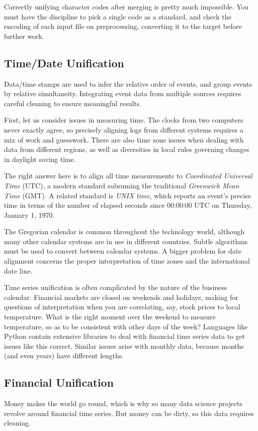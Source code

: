 \documentclass[10pt]{article}
\begin{document}
Correctly unifying character codes after merging is pretty much impossible. You must have the discipline to pick a single code as a standard, and check the encoding of each input file on preprocessing, converting it to the target before further work.

\subsection{Time/Date Unification}
Data/time stamps are used to infer the relative order of events, and group events by relative simultaneity. Integrating event data from multiple sources requires careful cleaning to ensure meaningful results.

First, let us consider issues in measuring time. The clocks from two computers never exactly agree, so precisely aligning logs from different systems requires a mix of work and guesswork. There are also time zone issues when dealing with data from different regions, as well as diversities in local rules governing changes in daylight saving time.

The right answer here is to align all time measurements to \emph{Coordinated Universal Time} (UTC), a modern standard subsuming the traditional \emph{Greenwich Mean Time} (GMT). A related standard is \emph{UNIX time}, which reports an event's precise time in terms of the number of elapsed seconds since 00:00:00 UTC on Thursday, January 1, 1970.

The Gregorian calendar is common throughout the technology world, although many other calendar systems are in use in different countries. Subtle algorithms must be used to convert between calendar systems. A bigger problem for date alignment concerns the proper interpretation of time zones and the international date line.

Time series unification is often complicated by the nature of the business calendar. Financial markets are closed on weekends and holidays, making for questions of interpretation when you are correlating, say, stock prices to local temperature. What is the right moment over the weekend to measure temperature, so as to be consistent with other days of the week? Languages like Python contain extensive libraries to deal with financial time series data to get issues like this correct. Similar issues arise with monthly data, because months (and even years) have different lengths.

\subsection{Financial Unification}
Money makes the world go round, which is why so many data science projects revolve around financial time series. But money can be dirty, so this data requires cleaning.
\end{document}
